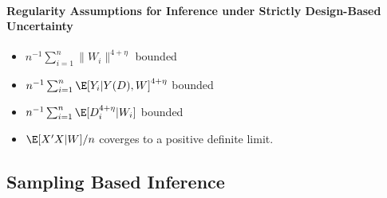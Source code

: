 \documentclass[12pt]{article}
\theoremstyle{plain}
\theoremstyle{definition}
\theoremstyle{remark}
\newcommand{\sumin}{\sum^n_{i=1}}
\begin{document}
\paragraph{Regularity Assumptions for Inference under Strictly Design-Based Uncertainty}
\begin{itemize}
  \item $n^{-1}\sumin \lVert W_i\rVert^{4+\eta}$ bounded
  \item $n^{-1}\sumin \E[Y_i|Y(D),W]^{4+\eta}$ bounded
  \item $n^{-1}\sumin \E[D_i^{4+\eta}|W_i]$ bounded
  \item $\E[X'X|W]/n$ coverges to a positive definite limit.
\end{itemize}


\clearpage
\subsection{Sampling Based Inference}
\end{document}
